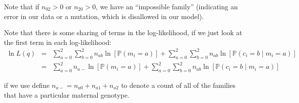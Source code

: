 \documentclass[11pt]{article}
\renewcommand{\Pr}{\mathbb{P}}
\begin{document}
Note that if $n_{02} > 0$ or $n_{20} > 0$, we have an ``impossible family'' (indicating an error in our data or a mutation, which is
disallowed in our model).

Note that there is some sharing of terms in the log-likelihood, if we just look at the first term in each log-likelihood:
\begin{eqnarray}
 \ln L(q) & = & \sum_{a=0}^{2}\sum_{b=0}^{2}
 n_{ab}\ln\left[\Pr\left(m_i=a\right)\right] + \sum_{a=0}^{2}\sum_{b=0}^{2} n_{ab}\ln\left[\Pr\left(c_i=b\mid m_i=a\right)\right] \\
 & = & \sum_{a=0}^{2}
 n_{a-}\ln\left[\Pr\left(m_i=a\right)\right] + \sum_{a=0}^{2}\sum_{b=0}^{2} n_{ab}\ln\left[\Pr\left(c_i=b\mid m_i=a\right)\right] 
\end{eqnarray}

if we use define $n_{a-} = n_{a0} + n_{a1} + n_{a2}$ to denote a count of all of the families that have a particular maternal
genotype.
\end{document}
